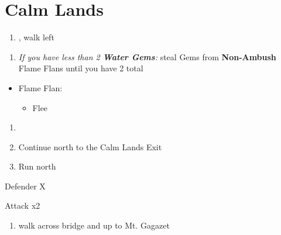 \chapter{Calm Lands}

\begin{enumerate}
    \item \sd, walk left
\end{enumerate}
\begin{spheregrid}
    \begin{itemize}
        \yunaf
    \end{itemize}
\end{spheregrid}
\begin{enumerate}[resume]
    \item \textit{If you have less than 2 \textbf{Water Gems}:} steal Gems from \textbf{Non-Ambush} Flame Flans until you have 2 total
\end{enumerate}
\begin{encounters}
    \begin{itemize}
        \item Flame Flan:
        \begin{itemize}
            \rikkuf Steal
            \item Flee
        \end{itemize}
    \end{itemize}
\end{encounters}
\begin{enumerate}[resume]
    \item \formation{\tidus}{\rikku}{\kimahri}
    \item Continue north to the Calm Lands Exit
    \item Run north
\end{enumerate}
\begin{battle}[64000]{Defender X}
    \begin{itemize}
        \switch{\tidus}{\yuna}
        \summon{\bahamut}
        \bahamutf Attack x2
    \end{itemize}
\end{battle}
\begin{enumerate}[resume]
    \item walk across bridge and up to Mt. Gagazet
\end{enumerate}
